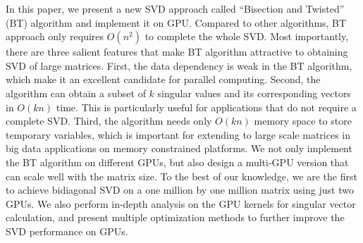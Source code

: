 
In this paper, we present a new SVD approach called ``Bisection and Twisted'' (BT) algorithm and implement it on GPU. 
Compared to other algorithms, BT approach only requires $O(n^2)$ to complete the whole SVD\cite{05UCB,09NLAAtwisted}.
Most importantly, there are three salient features that make BT algorithm attractive
to obtaining SVD of large matrices. 
First, the data dependency is weak in the BT algorithm, which make it an excellent candidate for parallel computing. 
Second, the algorithm can obtain a subset of $k$ singular values and its corresponding vectors in $O(kn)$ time. 
This is particularly useful for applications that do not require a complete SVD.
Third, the algorithm needs only $O(kn)$ memory space to store temporary variables, which is important for extending to large scale matrices in big data applications on memory constrained platforms.
We not only implement the BT algorithm on different GPUs, but also design a multi-GPU version that can scale well with the matrix size. To the best of our knowledge, we are the first to achieve bidiagonal SVD on a one million by one million matrix using just two GPUs.
We also perform in-depth analysis on the GPU kernels for singular vector calculation, and present multiple optimization methods to further improve the SVD performance on GPUs.


